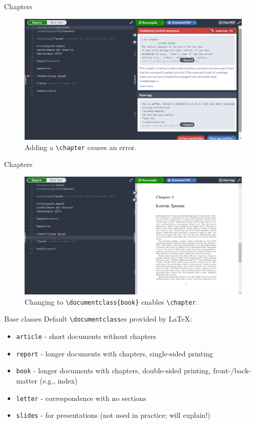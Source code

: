 \documentclass{beamer}
\begin{document}
{  \begin{frame}{Chapters}
    \begin{figure}
      \includegraphics[width=0.9\linewidth]{day01-overleaf-07B-chapter-error.png}
      \caption{Adding a \texttt{\textbackslash chapter}  causes an error.}
      \label{fig:day01-overleaf-07B}
    \end{figure}
  \end{frame}

  \begin{frame}{Chapters}
    \begin{figure}
      \includegraphics[width=0.9\linewidth]{day01-overleaf-07C-chapter-fix.png}
      \caption{Changing to \texttt{\textbackslash documentclass\{book\}} enables \texttt{\textbackslash chapter}.}
      \label{fig:day01-overleaf-07C}
    \end{figure}
  \end{frame}

  \begin{frame}{Base classes}
    Default \texttt{\textbackslash documentclass}es provided by \LaTeX:
    \begin{itemize}
      \item \texttt{article} - short documents without chapters
      \item \texttt{report} - longer documents with chapters, single-sided printing
      \item \texttt{book} - longer documents with chapters, double-sided printing, front-/back-matter (e.g., index)
      \item \texttt{letter} - correspondence with no sections
      \item \texttt{slides} - for presentations (not used in practice; will explain!)
    \end{itemize}
  \end{frame}

}
\end{document}
